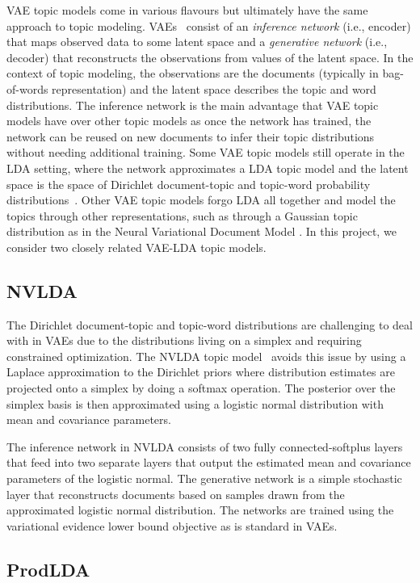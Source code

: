 \documentclass[10pt]{article}
\begin{document}
VAE topic models come in various flavours but ultimately have the same approach to topic modeling. VAEs~\cite{Kingma:2013} consist of an \textit{inference network} (i.e., encoder) that maps observed data to some latent space and a \textit{generative network} (i.e., decoder) that reconstructs the observations from values of the latent space. In the context of topic modeling, the observations are the documents (typically in bag-of-words representation) and the latent space describes the topic and word distributions. The inference network is the main advantage that VAE topic models have over other topic models as once the network has trained, the network can be reused on new documents to infer their topic distributions without needing additional training. Some VAE topic models still operate in the LDA setting, where the network approximates a LDA topic model and the latent space is the space of Dirichlet document-topic and topic-word probability distributions~\cite{Srivastava:2017}. Other VAE topic models forgo LDA all together and model the topics through other representations, such as through a Gaussian topic distribution as in the Neural Variational Document Model \cite{Miao:2015}. In this project, we consider two closely related VAE-LDA topic models.

\subsection{NVLDA}

The Dirichlet document-topic and topic-word distributions are challenging to deal with in VAEs due to the distributions living on a simplex and requiring constrained optimization. The NVLDA topic model~\cite{Srivastava:2017} avoids this issue by using a Laplace approximation to the Dirichlet priors where distribution estimates are projected onto a simplex by doing a softmax operation. The posterior over the simplex basis is then approximated using a logistic normal distribution with mean and covariance parameters.

The inference network in NVLDA consists of two fully connected-softplus layers that feed into two separate layers that output the estimated mean and covariance parameters of the logistic normal. The generative network is a simple stochastic layer that reconstructs documents based on samples drawn from the approximated logistic normal distribution. The networks are trained using the variational evidence lower bound objective as is standard in VAEs.

\subsection{ProdLDA}
\end{document}
